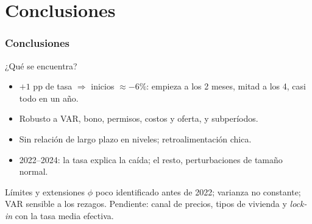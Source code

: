 \documentclass[aspectratio=169]{beamer}
\begin{document}
\section{Conclusiones}
\begin{frame}
  \frametitle{Conclusiones}
  \begin{block}{¿Qué se encuentra?}
    \begin{itemize}
      \item $+1$ pp de tasa $\Rightarrow$ inicios $\approx -6\%$: empieza a los 2 meses, mitad a los 4, casi todo en un año.
      \item Robusto a VAR, bono, permisos, costos y oferta, y subperíodos.
      \item Sin relación de largo plazo en niveles; retroalimentación chica.
      \item 2022--2024: la tasa explica la caída; el resto, perturbaciones de tamaño normal.
    \end{itemize}
  \end{block}
  \begin{alertblock}{Límites y extensiones}
    \small $\phi$ poco identificado antes de 2022; varianza no constante; VAR sensible a los rezagos. Pendiente: canal de precios, tipos de vivienda y \emph{lock-in} con la tasa media efectiva.
  \end{alertblock}
\end{frame}
\end{document}
